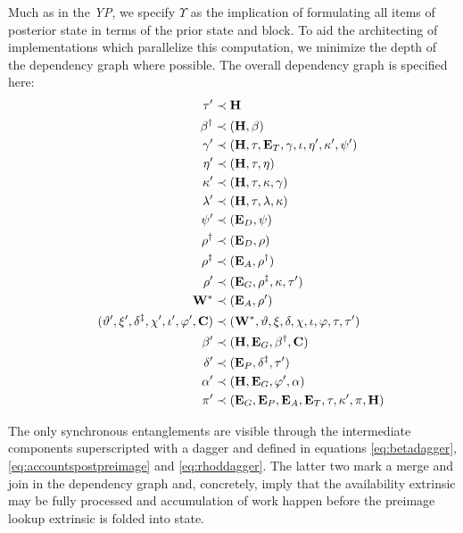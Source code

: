 Much as in the \emph{YP}, we specify $\Upsilon$ as the implication of formulating all items of posterior state in terms of the prior state and block. To aid the architecting of implementations which parallelize this computation, we minimize the depth of the dependency graph where possible. The overall dependency graph is specified here:
\begin{align}\label{eq:transitionfunctioncomposition}
  \tau' &\prec \mathbf{H} \\
  \beta^\dagger &\prec (\mathbf{H}, \beta) \label{eq:betadagger} \\
  \gamma' &\prec (\mathbf{H}, \tau, \xttickets, \gamma, \iota, \eta', \kappa', \psi') \\
  \eta' &\prec (\mathbf{H}, \tau, \eta) \\
  \kappa' &\prec (\mathbf{H}, \tau, \kappa, \gamma) \\
  \lambda' &\prec (\mathbf{H}, \tau, \lambda, \kappa) \\
  \psi' &\prec (\xtdisputes, \psi) \\
  \rho^\dagger &\prec (\xtdisputes, \rho) \label{eq:rhodagger} \\
  \rho^\ddagger &\prec (\xtassurances, \rho^\dagger) \label{eq:rhoddagger} \\
  \rho' &\prec (\xtguarantees, \rho^\ddagger, \kappa, \tau') \\
  \mathbf{W}^* &\prec (\xtassurances, \rho') \\
  (\ready', \accumulated', \accountspostxfer, \chi', \iota', \varphi', \beefycommitmap) &\prec (\mathbf{W}^*, \ready, \accumulated, \accountspre, \chi, \iota, \varphi, \tau, \tau') \\
  \beta' &\prec (\mathbf{H}, \xtguarantees, \beta^\dagger, \beefycommitmap) \\
  \accountspostpreimage &\prec (\xtpreimages, \accountspostxfer, \tau') \label{eq:accountspostpreimage} \\
  \alpha' &\prec (\mathbf{H}, \xtguarantees, \varphi', \alpha) \\
  \pi' &\prec (\xtguarantees, \xtpreimages, \xtassurances, \xttickets, \tau, \kappa', \pi, \mathbf{H})\!\!\!\!\!\!\!\!
\end{align}

The only synchronous entanglements are visible through the intermediate components superscripted with a dagger and defined in equations \ref{eq:betadagger}, \ref{eq:accountspostpreimage} and \ref{eq:rhoddagger}. The latter two mark a merge and join in the dependency graph and, concretely, imply that the availability extrinsic may be fully processed and accumulation of work happen before the preimage lookup extrinsic is folded into state.

